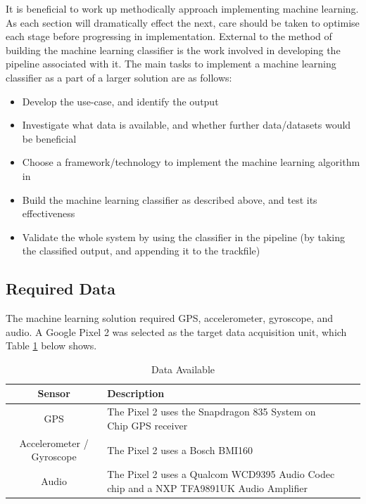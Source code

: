 \documentclass{UoNMCHA}
\newcommand{\tref}[1] {Table \ref{#1}}
\numberwithin{equation}{section}
\begin{document}
It is beneficial to work up methodically approach implementing machine learning. As each section will dramatically effect the next, care should be taken to optimise each stage before progressing in implementation. External to the method of building the machine learning classifier is the work involved in developing the pipeline associated with it. The main tasks to implement a machine learning classifier as a part of a larger solution are as follows:

\begin{itemize}
    \item Develop the use-case, and identify the output
    \item Investigate what data is available, and whether further data/datasets would be beneficial
    \item Choose a framework/technology to implement the machine learning algorithm in
    \item Build the machine learning classifier as described above, and test its effectiveness
    \item Validate the whole system by using the classifier in the pipeline (by taking the classified output, and appending it to the trackfile)
\end{itemize}

\subsection{Required Data}
The machine learning solution required GPS, accelerometer, gyroscope, and audio. A Google Pixel 2 was selected as the target data acquisition unit, which \tref{tab:AndroidSensorsAvailable} below shows.
\begin{table}[h!] 
    \begin{center}
        \caption{Data Available \cite{pixelteardown}}\label{tab:AndroidSensorsAvailable}
        {\footnotesize
            \begin{tabular}{clll}
                \hline\hline Sensor & Description \\ \hline 
                GPS & The Pixel 2 uses the Snapdragon 835 System on Chip GPS receiver\\
                Accelerometer / Gyroscope & The Pixel 2 uses a Bosch BMI160 \\
                Audio & The Pixel 2 uses a Qualcom WCD9395 Audio Codec chip and a NXP TFA9891UK Audio Amplifier \\ \hline
            \end{tabular}
        }
    \end{center}
\end{table}
\end{document}
